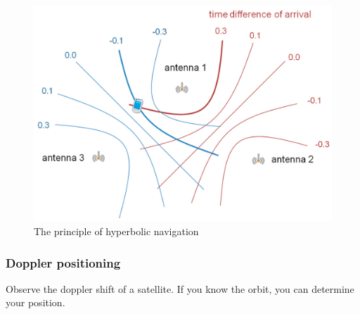 \begin{figure}[htbp]
    \centering
    \includegraphics[width=.8\linewidth]{img/hyperbolic-navigation}
    \caption{The principle of hyperbolic navigation}
    \label{fig:hyperbolic-navigation}
\end{figure}

\subsubsection{Doppler positioning}
Observe the doppler shift of a satellite. If you know the orbit, you can determine your position.
